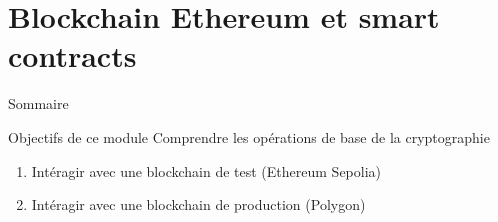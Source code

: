 \section{Blockchain Ethereum et smart contracts}

\begin{frame}{Sommaire}
  \setcounter{tocdepth}{2}
\end{frame}

\begin{frame}{Objectifs de ce module}
  Comprendre les opérations de base de la cryptographie
  \begin{enumerate}
    \item Intéragir avec une blockchain de test (Ethereum Sepolia)
    \item Intéragir avec une blockchain de production (Polygon)
  \end{enumerate}
\end{frame}

